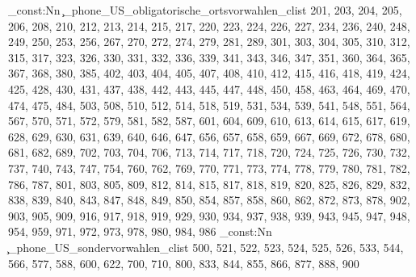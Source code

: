 \clist_const:Nn \c_phone_US_obligatorische_ortsvorwahlen_clist {201,
203,
204,
205,
206,
208,
210,
212,
213,
214,
215,
217,
220,
223,
224,
226,
227, %
234,
236,
240,
248,
249,
250,
253,
256,
267,
270,
272,
274, %
279,
281,
289,
301,
303,
304,
305,
310,
312,
315,
317,
323,
326,
330,
331,
332,
336,
339,
341,
343,
346,
347,
351,
360,
364,
365,
367,
368, %
380,
385,
402,
403,
404,
405,
407,
408,
410,
412,
415,
416,
418,
419,
424,
425,
428, %
430,
431,
437,
438,
442,
443,
445,
447,
448,
450,
458,
463,
464, %
469,
470,
474, %
475,
484,
503,
508,
510,
512,
514,
518,
519,
531,
534,
539,
541,
548,
551,
564,
567,
570,
571,
572,
579,
581,
582,
587,
601,
604,
609,
610,
613,
614,
615,
617,
619,
628,
629,
630,
631,
639,
640,
646,
647,
656, %
657,
658,
659,
667,
669,
672,
678,
680,
681,
682,
689,
702,
703,
704,
706,
713,
714,
717,
718,
720,
724,
725,
726,
730, %
732,
737,
740,
743,
747,
754,
760,
762,
769,
770,
771, %
773,
774,
778,
779,
780,
781,
782,
786,
787,
801,
803,
805,
809,
812,
814,
815,
817,
818,
819,
820,
825,
826, %
829,
832,
838,
839,
840,
843,
847,
848,
849,
850,
854,
857,
858,
860,
862,
872,
873,
878,
902,
903,
905,
909,
916,
917,
918,
919,
929,
930,
934,
937,
938,
939,
943, %
945,
947,
948, %
954,
959,
971,
972,
973,
978,
980,
984,
986}
\clist_const:Nn \c_phone_US_sondervorwahlen_clist {500,
521,
522,
523,
524,
525,
526,
533,
544,
566,
577,
588,
600,
622,
700,
710,
800,
833,
844,
855,
866,
877,
888,
900}
